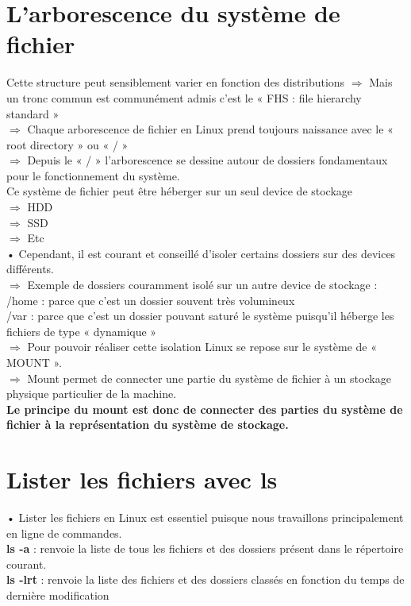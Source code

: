 \documentclass[a4paper, 12pt, french]{book}
\begin{document}
\section{\Large L’arborescence du système de fichier} 
 Cette structure peut sensiblement varier en fonction des distributions
$\Rightarrow$ Mais un tronc commun est communément admis c’est le « FHS : file hierarchy
standard »\\
$\Rightarrow$ Chaque arborescence de fichier en Linux prend toujours naissance avec le
« root directory » ou « / »\\
$\Rightarrow$ Depuis le « / » l’arborescence se dessine autour de dossiers fondamentaux
pour le fonctionnement du système.\\
Ce système de fichier peut être héberger sur un seul device de stockage\\
$\Rightarrow$ HDD\\
$\Rightarrow$ SSD\\
$\Rightarrow$ Etc\\
• Cependant, il est courant et conseillé d’isoler certains dossiers sur des devices différents.\\
$\Rightarrow$ Exemple de dossiers couramment isolé sur un autre device de stockage :\\
 /home : parce que c’est un dossier souvent très volumineux\\
 /var : parce que c’est un dossier pouvant saturé le système puisqu’il héberge les fichiers de type « dynamique »\\
$\Rightarrow$ Pour pouvoir réaliser cette isolation Linux se repose sur le système de « MOUNT ».\\
$\Rightarrow$ Mount permet de connecter une partie du système de fichier à un stockage physique particulier de la machine.\\
\textbf{Le principe du mount est donc de connecter des parties du système de fichier à la représentation du système de stockage.}
\section{\Large Lister les fichiers avec ls} 
 
• Lister les fichiers en Linux est essentiel puisque nous travaillons principalement en ligne de commandes.\\
\textbf{ls -a} : renvoie la liste de tous les fichiers et des dossiers présent dans le
répertoire courant.\\
\textbf{ls -lrt} : renvoie la liste des fichiers et des dossiers classés en fonction du temps
de dernière modification
 
\end{document}
